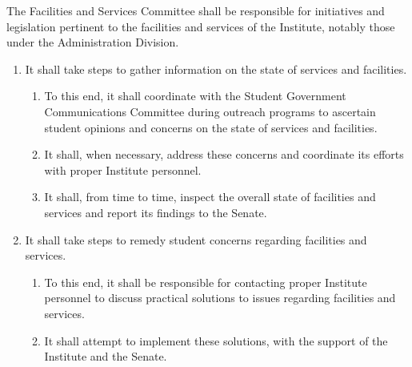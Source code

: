 \item The Facilities and Services Committee shall be responsible for initiatives and legislation pertinent to the facilities and services
of the Institute, notably those under the Administration Division.
\begin{enumerate}
    \item It shall take steps to gather information on the state of services and facilities.
    \begin{enumerate}
        \item To this end, it shall coordinate with the Student Government Communications Committee during outreach programs to
        ascertain student opinions and concerns on the state of services and facilities.
        \item It shall, when necessary, address these concerns and coordinate its efforts with proper Institute personnel.
        \item It shall, from time to time, inspect the overall state of facilities and services and report its findings to the Senate.
    \end{enumerate}

    \item It shall take steps to remedy student concerns regarding facilities and services.
    \begin{enumerate}
        \item To this end, it shall be responsible for contacting proper Institute personnel to discuss practical solutions to issues
        regarding facilities and services.
        \item It shall attempt to implement these solutions, with the support of the Institute and the Senate.
    \end{enumerate}
\end{enumerate}
